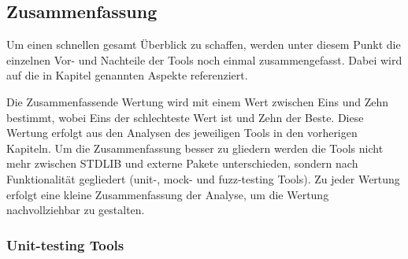 \subsection{Zusammenfassung}\label{zusammenfassung}

Um einen schnellen gesamt Überblick zu schaffen, werden unter diesem Punkt die
einzelnen Vor- und Nachteile der Tools noch einmal zusammengefasst. Dabei wird
auf die in Kapitel  genannten Aspekte referenziert.

Die Zusammenfassende Wertung wird mit einem Wert zwischen Eins und Zehn
bestimmt, wobei Eins der schlechteste Wert ist und Zehn der Beste. Diese Wertung
erfolgt aus den Analysen des jeweiligen Tools in den vorherigen Kapiteln. Um die
Zusammenfassung besser zu gliedern werden die Tools nicht mehr zwischen STDLIB
und externe Pakete unterschieden, sondern nach Funktionalität gegliedert (unit-,
\gls{mock}- und \gls{fuzz}-testing Tools). Zu jeder Wertung erfolgt eine kleine
Zusammenfassung der Analyse, um die Wertung nachvollziehbar zu gestalten.

\subsubsection{Unit-testing Tools}\label{zusammenfassung:unit}

